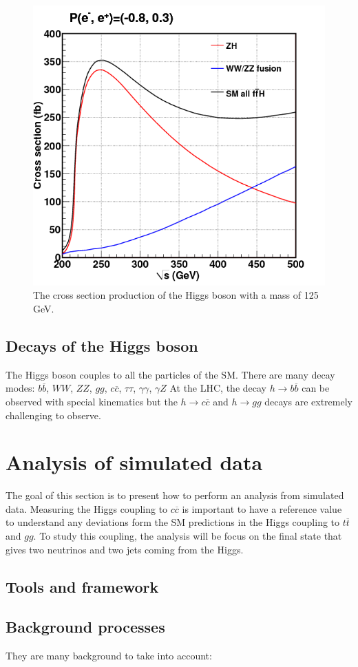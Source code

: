   \begin{figure}
    \centering
    \includegraphics[width = 10 cm]{Pictures/Higgs/higgs_xsec_P-8_3.png}
    \caption{The cross section production of the Higgs boson with a mass of 125 GeV\cite{Asner2013}.}
    \label{fig:higgsXsec}
  \end{figure}

  \subsection{Decays of the Higgs boson}

  The Higgs boson couples to all the particles of the SM.
  There are many decay modes: $b\overline{b}$, $WW$, $ZZ$, $gg$, $c\overline{c}$, $\tau \tau$, $\gamma \gamma$, $\gamma Z$
  At the LHC, the decay $h \rightarrow b\overline{b}$ can be observed with special kinematics but the $h \rightarrow c \overline{c}$ and $h \rightarrow gg$ decays are extremely challenging to observe.


  \section{Analysis of simulated data}
  
  The goal of this section is to present how to perform an analysis from simulated data. 
  Measuring the Higgs coupling to $c\overline{c}$ is important to have a reference value to understand any deviations form the SM predictions in the Higgs coupling to $t\overline{t}$ and $gg$.
  To study this coupling, the analysis will be focus on the final state that gives two neutrinos and two jets coming from the Higgs.

  \subsection{Tools and framework}
  
  \subsection{Background processes}

  They are many background to take into account:   
